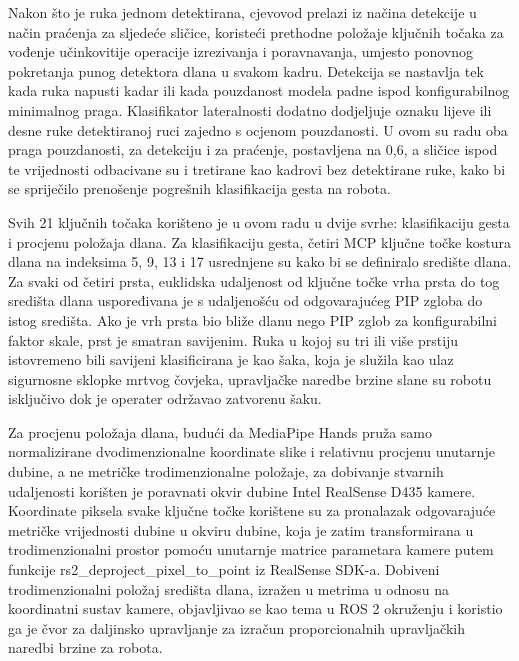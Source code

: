 \documentclass[12pt,a4paper,oneside]{report}
\begin{document}
Nakon što je ruka jednom detektirana, cjevovod prelazi iz načina detekcije u način praćenja za sljedeće 
sličice, koristeći prethodne položaje ključnih točaka za vođenje učinkovitije operacije izrezivanja i 
poravnavanja, umjesto ponovnog pokretanja punog detektora dlana u svakom kadru. Detekcija se nastavlja tek 
kada ruka napusti kadar ili kada pouzdanost modela padne ispod konfigurabilnog minimalnog praga. Klasifikator 
lateralnosti dodatno dodjeljuje oznaku lijeve ili desne ruke detektiranoj ruci zajedno s ocjenom pouzdanosti. 
U ovom su radu oba praga pouzdanosti, za detekciju i za praćenje, postavljena na 0,6, a sličice ispod te 
vrijednosti odbacivane su i tretirane kao kadrovi bez detektirane ruke, kako bi se spriječilo prenošenje 
pogrešnih klasifikacija gesta na robota.

Svih 21 ključnih točaka korišteno je u ovom radu u dvije svrhe: klasifikaciju gesta i procjenu položaja dlana. 
Za klasifikaciju gesta, četiri MCP ključne točke kostura dlana na indeksima 5, 9, 13 i 17 usrednjene su kako bi 
se definiralo središte dlana. Za svaki od četiri prsta, euklidska udaljenost od ključne točke vrha prsta do 
tog središta dlana uspoređivana je s udaljenošću od odgovarajućeg PIP zgloba do istog središta. Ako je vrh 
prsta bio bliže dlanu nego PIP zglob za konfigurabilni faktor skale, prst je smatran savijenim. Ruka u kojoj 
su tri ili više prstiju istovremeno bili savijeni klasificirana je kao šaka, koja je služila kao ulaz 
sigurnosne sklopke mrtvog čovjeka, upravljačke naredbe brzine slane su robotu isključivo dok je operater 
održavao zatvorenu šaku.

Za procjenu položaja dlana, budući da MediaPipe Hands pruža samo normalizirane dvodimenzionalne koordinate 
slike i relativnu procjenu unutarnje dubine, a ne metričke trodimenzionalne položaje, za dobivanje stvarnih 
udaljenosti korišten je poravnati okvir dubine Intel RealSense D435 kamere. Koordinate piksela svake ključne 
točke korištene su za pronalazak odgovarajuće metričke vrijednosti dubine u okviru dubine, koja je zatim 
transformirana u trodimenzionalni prostor pomoću unutarnje matrice parametara kamere putem funkcije 
rs2\_deproject\_pixel\_to\_point iz RealSense SDK-a. Dobiveni trodimenzionalni položaj središta dlana, 
izražen u metrima u odnosu na koordinatni sustav kamere, objavljivao se kao tema u ROS 2 okruženju i 
koristio ga je čvor za daljinsko upravljanje za izračun proporcionalnih upravljačkih naredbi brzine za robota.
\end{document}
